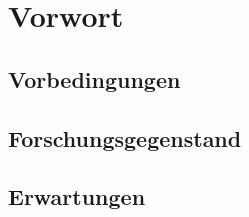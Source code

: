  

\chapter[Short Title]{Vorwort}

\section{Vorbedingungen}
\section{Forschungsgegenstand}
\section{Erwartungen}

